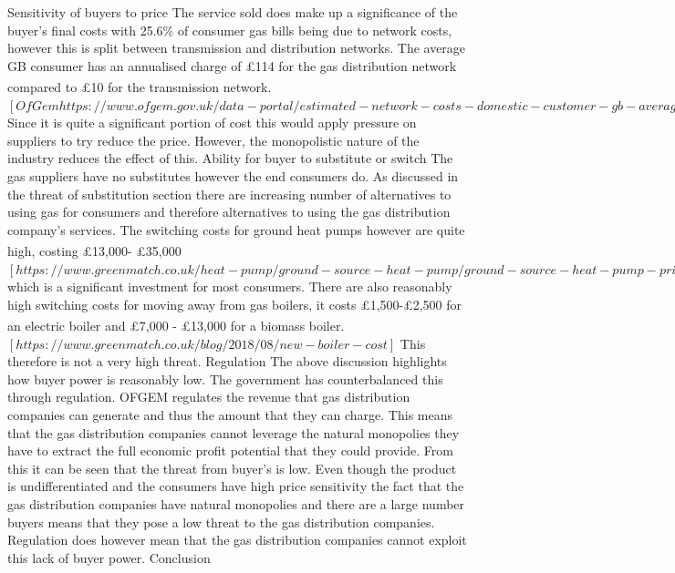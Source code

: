 \documentclass[11pt]{article}		%
\newcommand{\supercite}[1]{\textsuperscript{\cite{#1}}}		%
\begin{document}
                Sensitivity of buyers to price
                The service sold does make up a significance of the buyer’s final costs with 25.6\% of consumer gas bills being due to network costs, however this is split between transmission and distribution networks. The average GB consumer has an annualised charge of £114 for the gas distribution network compared to £10 for the transmission network.\supercite{gas_cost}$[  OfGem https://www.ofgem.gov.uk/data-portal/estimated-network-costs-domestic-customer-gb-average]$  Since it is quite a significant portion of cost this would apply pressure on suppliers to try reduce the price. However, the monopolistic nature of the industry reduces the effect of this.
                Ability for buyer to substitute or switch
                The gas suppliers have no substitutes however the end consumers do. As discussed in the threat of substitution section there are increasing number of alternatives to using gas for consumers and therefore alternatives to using the gas distribution company’s services. The switching costs for ground heat pumps however are quite high, costing £13,000- £35,000\supercite{Heat_Pump_Cost} $[  https://www.greenmatch.co.uk/heat-pump/ground-source-heat-pump/ground-source-heat-pump-prices]$ which is a significant investment for most consumers. There are also reasonably high switching costs for moving away from gas boilers, it costs £1,500-£2,500 for an electric boiler and £7,000 - £13,000 for a biomass boiler.\supercite{boiler_cost} $[  https://www.greenmatch.co.uk/blog/2018/08/new-boiler-cost]$  This therefore is not a very high threat.
                Regulation
                The above discussion highlights how buyer power is reasonably low. The government has counterbalanced this through regulation. OFGEM regulates the revenue that gas distribution companies can generate and thus the amount that they can charge. This means that the gas distribution companies cannot leverage the natural monopolies they have to extract the full economic profit potential that they could provide.
                From this it can be seen that the threat from buyer’s is low. Even though the product is undifferentiated and the consumers have high price sensitivity the fact that the gas distribution companies have natural monopolies and there are a large number buyers means that they pose a low threat to the gas distribution companies. Regulation does however mean that the gas distribution companies cannot exploit this lack of buyer power.
                Conclusion
\end{document}
